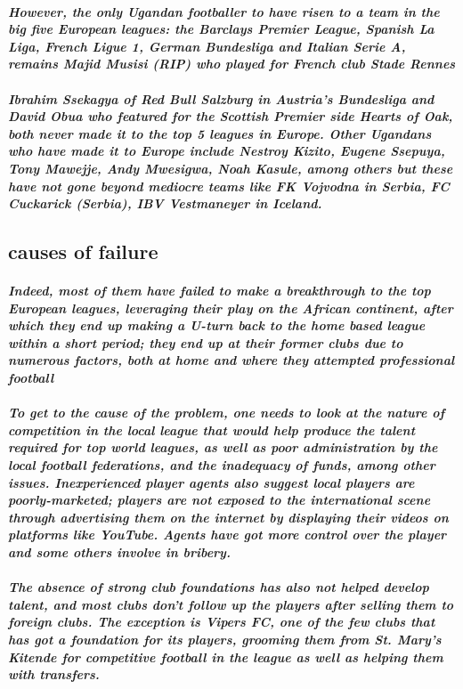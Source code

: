 \documentclass[a4paper,12pt]{article}
\begin{document}
\paragraph{ \sl However, the only Ugandan footballer to have risen to a team in the big five European leagues: the Barclays Premier League, Spanish La Liga, French Ligue 1, German Bundesliga and Italian Serie A, remains Majid Musisi (RIP) who played for French club Stade Rennes}
\paragraph{\sl Ibrahim Ssekagya of Red Bull Salzburg in Austria’s Bundesliga and David Obua who featured for the Scottish Premier side Hearts of Oak, both never made it to the top 5 leagues in Europe. Other Ugandans who have made it to Europe include Nestroy Kizito, Eugene  Ssepuya, Tony Mawejje, Andy Mwesigwa, Noah Kasule, among others but these have not gone beyond mediocre teams like FK Vojvodna in Serbia, FC Cuckarick (Serbia), IBV Vestmaneyer in Iceland.}
\subsection{\sc causes of failure}
\paragraph{\sl Indeed, most of them have failed to make a breakthrough to the top European leagues, leveraging their play on the African continent, after which they end up making a U-turn back to the home based league within a short period; they end up at their former clubs due to numerous factors, both at home and where they attempted professional football}
\paragraph{\sl To get to the cause of the problem, one needs to look at the nature of competition in the local league that would help produce the talent required for top world leagues, as well as poor administration by the local football federations, and the inadequacy of funds, among other issues.
Inexperienced player agents also suggest local players are poorly-marketed; players are not exposed to the international scene through advertising them on the internet by displaying their videos on platforms like YouTube. Agents have got more control over the player and some others involve in bribery.
}
\paragraph{\sl The absence of strong club foundations has also not helped develop talent, and most clubs don’t follow up the players after selling them to foreign clubs. The exception is Vipers FC, one of the few clubs that has got a foundation for its players, grooming them from St. Mary’s Kitende for competitive football in the league as well as helping them with transfers.}
\end{document}
